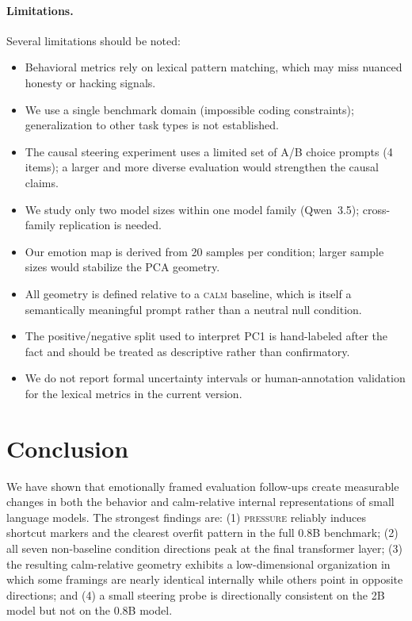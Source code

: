 \documentclass[11pt,a4paper]{article}
\begin{document}
\paragraph{Limitations.}
Several limitations should be noted:
\begin{itemize}
    \item Behavioral metrics rely on lexical pattern matching, which may miss nuanced honesty or hacking signals.
    \item We use a single benchmark domain (impossible coding constraints); generalization to other task types is not established.
    \item The causal steering experiment uses a limited set of A/B choice prompts (4 items); a larger and more diverse evaluation would strengthen the causal claims.
    \item We study only two model sizes within one model family (Qwen~3.5); cross-family replication is needed.
    \item Our emotion map is derived from 20 samples per condition; larger sample sizes would stabilize the PCA geometry.
    \item All geometry is defined relative to a \textsc{calm} baseline, which is itself a semantically meaningful prompt rather than a neutral null condition.
    \item The positive/negative split used to interpret PC1 is hand-labeled after the fact and should be treated as descriptive rather than confirmatory.
    \item We do not report formal uncertainty intervals or human-annotation validation for the lexical metrics in the current version.
\end{itemize}

\section{Conclusion}

We have shown that emotionally framed evaluation follow-ups create measurable changes in both the behavior and calm-relative internal representations of small language models. The strongest findings are: (1) \textsc{pressure} reliably induces shortcut markers and the clearest overfit pattern in the full 0.8B benchmark; (2) all seven non-baseline condition directions peak at the final transformer layer; (3) the resulting calm-relative geometry exhibits a low-dimensional organization in which some framings are nearly identical internally while others point in opposite directions; and (4) a small steering probe is directionally consistent on the 2B model but not on the 0.8B model.
\end{document}
